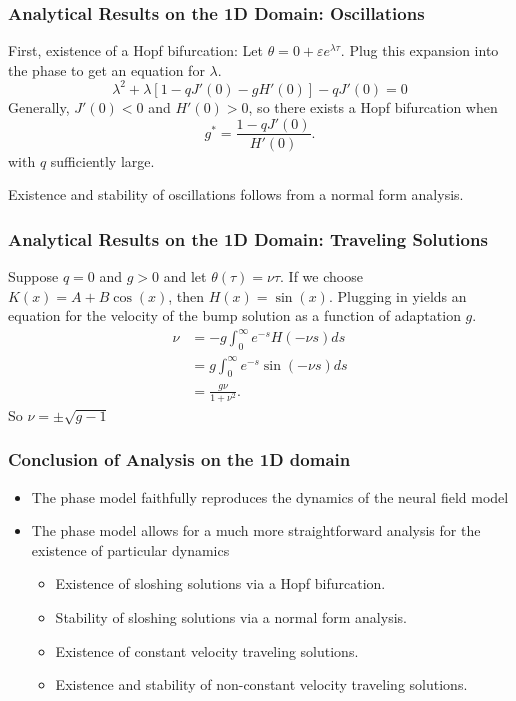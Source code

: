 \documentclass{beamer}
\newcommand{\ve}{\varepsilon}
\begin{document}
\begin{frame}
 \frametitle{Analytical Results on the 1D Domain: Oscillations}
 First, existence of a Hopf bifurcation:
 Let $\theta = 0 + \ve e^{\lambda \tau}$. Plug this expansion into the phase to get an equation for $\lambda$.
\begin{equation*}
\lambda^2 + \lambda[1-qJ'(0)-gH'(0)] - qJ'(0) = 0
\end{equation*}
Generally, $J'(0) < 0$ and $H'(0) > 0$, so there exists a Hopf bifurcation when
\begin{equation*}
 g^* = \frac{1-qJ'(0)}{H'(0)}.
\end{equation*}
with $q$ sufficiently large.

Existence and stability of oscillations follows from a normal form analysis.
\end{frame}

\begin{frame}
\frametitle{Analytical Results on the 1D Domain: Traveling Solutions}
Suppose $q=0$ and $g > 0$ and let $\theta(\tau) = \nu\tau$. If we choose $K(x)=A + B\cos(x)$, then $H(x) = \sin(x)$. Plugging in yields an equation for the velocity of the bump solution as a function of adaptation $g$.
\begin{align*}
 \nu &= -g \int_0^\infty e^{-s} H(-\nu s)ds\\
 &= g \int_0^\infty e^{-s} \sin(-\nu s)ds\\
 &= \frac{g\nu}{1+\nu^2}.
\end{align*}
So $\nu = \pm \sqrt{g-1}$
\end{frame}


\begin{frame}
 \frametitle{Conclusion of Analysis on the 1D domain}
 \begin{itemize}
  \item The phase model faithfully reproduces the dynamics of the neural field model
  \item The phase model allows for a much more straightforward analysis for the existence of particular dynamics
  \begin{itemize}
  \item Existence of sloshing solutions via a Hopf bifurcation.
  \item Stability of sloshing solutions via a normal form analysis.
  \item Existence of constant velocity traveling solutions.
  \item Existence and stability of non-constant velocity traveling solutions.
 \end{itemize}
\end{itemize}
\end{frame}
\end{document}
